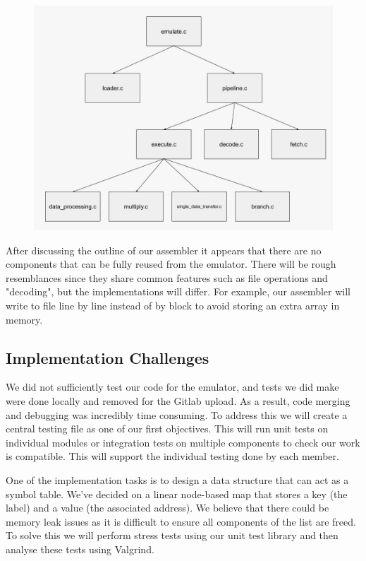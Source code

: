\documentclass[11pt]{article}
\begin{document}
 \begin{figure}[h]
 \includegraphics[scale=0.4]{emulator_structure}
 \centering
 \end{figure}

After discussing the outline of our assembler it appears that there are no components that can be fully reused from the emulator. There will be rough resemblances since they share common features such as file operations and "decoding", but the implementations will differ. For example, our assembler will write to file line by line instead of by block to avoid storing an extra array in memory.

\subsection*{Implementation Challenges}

We did not sufficiently test our code for the emulator, and tests we did make were done locally and removed for the Gitlab upload. As a result, code merging and debugging was incredibly time consuming. To address this we will create a central testing file as one of our first objectives. This will run unit tests on individual modules or integration tests on multiple components to check our work is compatible. This will support the individual testing done by each member.

One of the implementation tasks is to design a data structure that can act as a symbol table. We’ve decided on a linear node-based map that stores a key (the label) and a value (the associated address). We believe that there could be memory leak issues as it is difficult to ensure all components of the list are freed. To solve this we will perform stress tests using our unit test library and then analyse these tests using Valgrind.

  
\end{document}
